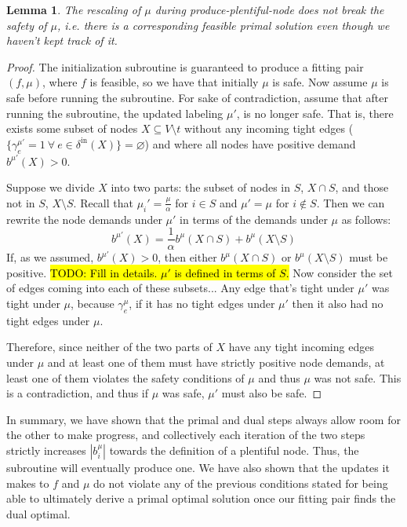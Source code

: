 \documentclass[11pt]{article}
\let\comment\todo
\newcommand{\david}[1]{\comment[nolist,color=orange!40]{d: #1}}
\newtheorem{lemma}[theorem]{Lemma}
\theoremstyle{definition}
\theoremstyle{definition}
\theoremstyle{definition}
\newcommand{\biu}{b_{i}^{\mu}}
\newcommand{\geu}{\gamma_e^{\mu}}
\newcommand{\vnott}{V \setminus t}
\newcommand{\din}{\delta^{\text{in}}}
\newcommand{\fp}{(f,\mu)}
\renewcommand{\todo}[1]{\hl{TODO: #1}}
\begin{document}
    \begin{lemma}
        The rescaling of $\mu$ during produce-plentiful-node does not break 
        the safety of $\mu$, i.e. there is a corresponding feasible primal
        solution even though we haven't kept track of it.
    \end{lemma}
    \begin{proof}
			\david{Fix this proof}
    The initialization subroutine is guaranteed to produce a fitting pair $\fp$,
    where $f$ is feasible, so we have that initially $\mu$ is safe. Now assume $\mu$
    is safe before running the subroutine. For sake of contradiction, assume that
    after running the subroutine, the updated labeling $\mu'$,
    is no longer safe. That is, there exists some subset of nodes $X \subseteq \vnott$  
    without any incoming tight edges ($\{\gamma_e^{\mu'} = 1\ \forall\ e \in \din(X)\} = \varnothing$)
    and where all nodes have positive demand $b^{\mu'}(X) > 0$.

    Suppose we divide $X$ into two parts: the subset of nodes in $S$, $X \cap S$, and those
    not in $S$, $X \setminus S$. Recall that $\mu_i' = \frac{\mu}{\alpha}$ for $i\in S$
    and $\mu' = \mu$ for $i \notin S$. Then we can rewrite the node demands under $\mu'$
    in terms of the demands under $\mu$ as follows:
    $$b^{\mu'}(X) = \frac{1}{\alpha}b^{\mu}(X \cap S) + b^{\mu}(X \setminus S)$$
    If, as we assumed, $b^{\mu'}(X) > 0$, then either $b^{\mu}(X \cap S)$ or 
    $b^{\mu}(X \setminus S)$ must be positive.
    \todo{Fill in details. $\mu'$ is defined in terms of $S$.}
    Now consider the set of edges coming into each of these subsets...
    Any edge that's tight under $\mu'$ was tight under $\mu$, because $\geu$, if
    it has no tight edges under $\mu'$ then it also had no tight edges under
    $\mu$.

    Therefore, since neither of the two parts of $X$
    have any tight incoming edges under $\mu$ and at least one of them
    must have strictly positive node demands, at least one of them
    violates the safety conditions of $\mu$ and thus $\mu$ was not safe.
    This is a contradiction, and thus if $\mu$ was safe, $\mu'$ must also be safe.

    \end{proof}

    In summary, we have shown that the primal and dual steps always allow room for the other to make progress, and collectively each iteration of the two steps strictly increases $|\biu|$ towards
    the definition of a plentiful node. Thus, the subroutine will eventually produce one. We have also shown that the updates it makes to $f$ and $\mu$ do not violate any of the previous conditions stated for being able to ultimately derive a primal optimal solution once our fitting pair finds the dual optimal. 
\end{document}
